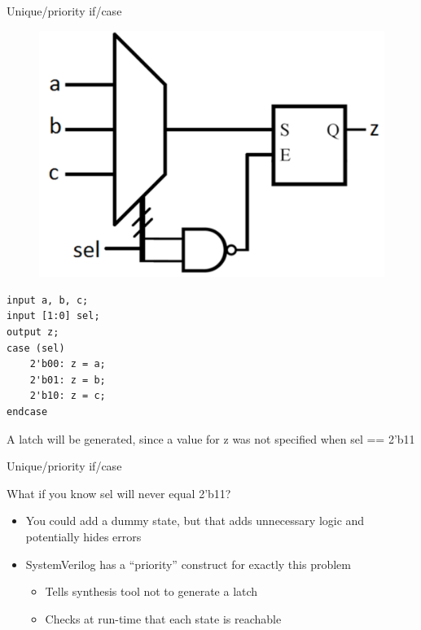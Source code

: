 \documentclass[table,dvipsnames]{beamer}
\begin{document}
 
\begin{frame}[fragile]{Unique/priority if/case}
		\begin{figure}
			\centering
			\includegraphics[width=\textwidth]{latch.png}
		\end{figure}

	\begin{verbatim}
input a, b, c;
input [1:0] sel;
output z;
case (sel)
	2'b00: z = a;
	2'b01: z = b;
	2'b10: z = c;
endcase	
	\end{verbatim}
	\begin{block}{}
		A latch will be generated, since a value for z was not specified when 
		\newline sel == 2'b11
	\end{block}

\end{frame}
 
 
 
  \begin{frame}{Unique/priority if/case}
	\begin{block}{What if you know sel will never equal 2'b11?}
		\begin{itemize}
			\item You could add a dummy state, but that adds unnecessary logic and potentially hides errors
			\item SystemVerilog has a ``priority'' construct for exactly this problem
			\begin{itemize}
				\item Tells synthesis tool not to generate a latch
				\item Checks at run-time that each state is reachable
			\end{itemize}
		\end{itemize}
	\end{block}
\end{frame}
\end{document}
